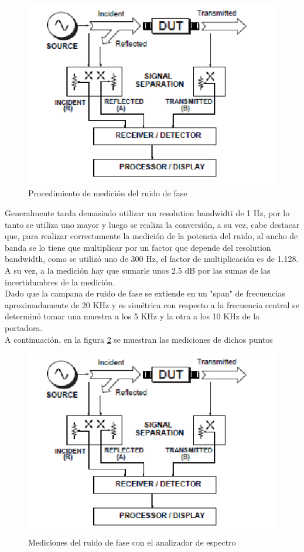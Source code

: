 \documentclass[a4paper,10pt]{article}
\begin{document}
		\begin{figure}[!htb]
			\centering
			\includegraphics[width=12cm]
			{Imagenes/diagAnalRedes.png}
			\caption{Procedimiento de medici\'on del ruido de fase}
			\label{img:002} 
		\end{figure}

		\indent Generalmente tarda demasiado utilizar un resolution bandwidti de
		1 Hz, por lo tanto se utiliza uno mayor y luego se realiza la 
		conversi\'on, a su vez, cabe destacar que, para realizar correctamente 
		la medici\'on de la potencia del ruido, al ancho de banda se lo tiene 
		que multiplicar por un factor que depende del resolution bandwidth, como
		se utiliz\'o uno de 300 Hz, el factor de multiplicaci\'on es de 1.128.\\
		\indent A su vez, a la medici\'on hay que sumarle unos 2.5 dB por las 
		sumas de las incertidumbres de la medici\'on. \\
		\indent Dado que la campana de ruido de fase se extiende en un "span" de
		frecuencias aproximadamente de 20 KHz y es sim\'etrica con respecto a la
		frecuencia central se determin\'o tomar una muestra a los 5 KHz y la 
		otra a los 10 KHz de la portadora. \\
		\indent A continuaci\'on, en la figura \ref{img:003} se muestran las 
		mediciones de dichos puntos 
		
		\begin{figure}[!htb]
			\centering
			\includegraphics[width=12cm]
			{Imagenes/diagAnalRedes.png}
			\caption{Mediciones del ruido de fase con el analizador de espectro}
			\label{img:003} 
		\end{figure}
		
\end{document}
